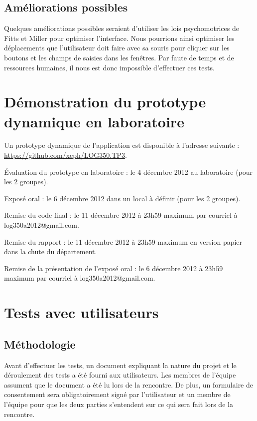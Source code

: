 \documentclass[letterpaper, oneside, 12pt, these, creativecommons]{thETS}
\begin{document}
\section{Améliorations possibles}

Quelques améliorations possibles seraient d'utiliser les lois psychomotrices de Fitts et Miller pour optimiser l'interface. Nous pourrions ainsi optimiser les déplacements que l'utilisateur doit faire avec sa souris pour cliquer sur les boutons et les champs de saisies dans les fenêtres. Par faute de temps et de ressources humaines, il nous est donc impossible d'effectuer ces tests.

\chapter{Démonstration du prototype dynamique en laboratoire}

Un prototype dynamique de l'application est disponible à l'adresse suivante : \\
\url{https://github.com/xeph/LOG350.TP3}.

Évaluation du prototype en laboratoire  : le 4 décembre 2012 au laboratoire (pour les 2 groupes).

Exposé oral  : le 6 décembre 2012 dans un local à définir (pour les 2 groupes).

Remise du code final : le 11 décembre 2012 à 23h59 maximum par courriel à log350a2012@gmail.com.

Remise du rapport :  le 11 décembre 2012 à 23h59 maximum en version papier dans la chute du département.

Remise de la présentation de l’exposé oral : le 6 décembre 2012 à 23h59 maximum par courriel à log350a2012@gmail.com.

\chapter{Tests avec utilisateurs}

\section{Méthodologie}

Avant d'effectuer les tests, un document expliquant la nature du projet et le déroulement des tests a été fourni aux utilisateurs. Les membres de l'équipe assument que le document a été lu lors de la rencontre. De plus, un formulaire de consentement sera obligatoirement signé par l'utilisateur et un membre de l'équipe pour que les deux parties s'entendent sur ce qui sera fait lors de la rencontre.
\end{document}
